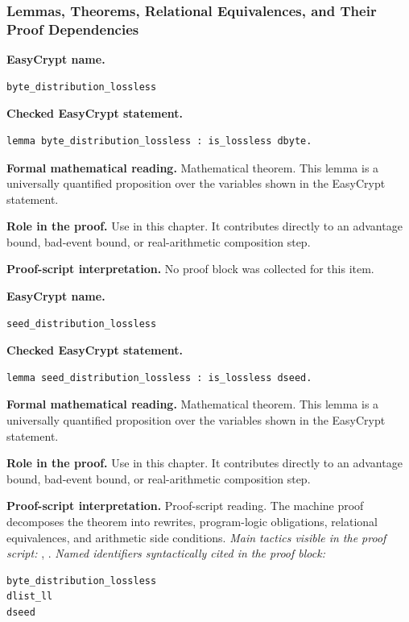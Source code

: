 \subsubsection*{Lemmas, Theorems, Relational Equivalences, and Their Proof Dependencies}
\begin{formaltheorem}
\noindent\textbf{EasyCrypt name.}
\begin{lstlisting}[language=EasyCrypt,basicstyle=\ttfamily\scriptsize]
byte_distribution_lossless
\end{lstlisting}
\noindent\textbf{Checked EasyCrypt statement.}
\begin{lstlisting}[language=EasyCrypt,basicstyle=\ttfamily\scriptsize]
lemma byte_distribution_lossless : is_lossless dbyte.
\end{lstlisting}
\noindent\textbf{Formal mathematical reading.}
Mathematical theorem. This lemma is a universally quantified proposition over the variables shown in the EasyCrypt statement.

\noindent\textbf{Role in the proof.}
Use in this chapter. It contributes directly to an advantage bound, bad-event bound, or real-arithmetic composition step.

\noindent\textbf{Proof-script interpretation.}
No proof block was collected for this item.

\end{formaltheorem}

\begin{formaltheorem}
\noindent\textbf{EasyCrypt name.}
\begin{lstlisting}[language=EasyCrypt,basicstyle=\ttfamily\scriptsize]
seed_distribution_lossless
\end{lstlisting}
\noindent\textbf{Checked EasyCrypt statement.}
\begin{lstlisting}[language=EasyCrypt,basicstyle=\ttfamily\scriptsize]
lemma seed_distribution_lossless : is_lossless dseed.
\end{lstlisting}
\noindent\textbf{Formal mathematical reading.}
Mathematical theorem. This lemma is a universally quantified proposition over the variables shown in the EasyCrypt statement.

\noindent\textbf{Role in the proof.}
Use in this chapter. It contributes directly to an advantage bound, bad-event bound, or real-arithmetic composition step.

\noindent\textbf{Proof-script interpretation.}
Proof-script reading. The machine proof decomposes the theorem into rewrites, program-logic obligations, relational equivalences, and arithmetic side conditions.
\emph{Main tactics visible in the proof script:} , .
\emph{Named identifiers syntactically cited in the proof block:}
\begin{lstlisting}[language=EasyCrypt,basicstyle=\ttfamily\scriptsize]
byte_distribution_lossless
dlist_ll
dseed
\end{lstlisting}

\end{formaltheorem}

